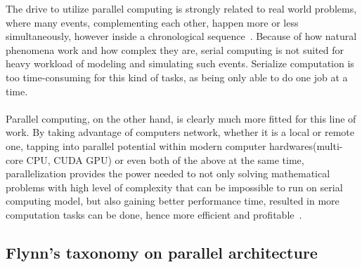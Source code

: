 The drive to utilize parallel computing is strongly related to real world problems, where many events, complementing each other, happen more or less simultaneously, however inside a chronological sequence~\cite{intro_parallel}. Because of how natural phenomena work and how complex they are, serial computing is not suited for heavy workload of modeling and simulating such events. Serialize computation is too time-consuming for this kind of tasks, as being only able to do one job at a time. \\
~\\
Parallel computing, on the other hand, is clearly much more fitted for this line of work. By taking advantage of computers network, whether it is a local or remote one, tapping into parallel potential within modern computer hardwares(multi-core CPU, CUDA GPU) or even both of the above at the same time, parallelization provides the power needed to not only solving mathematical problems with high level of complexity that can be impossible to run on serial computing model, but also gaining better performance time, resulted in more computation tasks can be done, hence more efficient and profitable~\cite{intro_parallel}. \\


\subsection{Flynn's taxonomy on parallel architecture}

